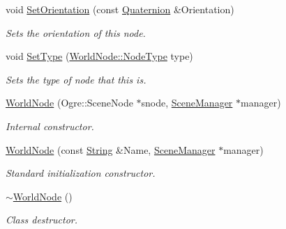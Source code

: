 \begin{DoxyCompactItemize}
void \hyperlink{classMezzanine_1_1WorldNode_afe9db5c3abeb608bf2d589c2a61da546}{SetOrientation} (const \hyperlink{classMezzanine_1_1Quaternion}{Quaternion} \&Orientation)
\begin{DoxyCompactList}\small\item\em Sets the orientation of this node. \item\end{DoxyCompactList}\item 
void \hyperlink{classMezzanine_1_1WorldNode_acccc6e4d11aad8bb7a495a64b5886b69}{SetType} (\hyperlink{classMezzanine_1_1WorldNode_a7b41cfe149e688905e56fb395d6a2493}{WorldNode::NodeType} type)
\begin{DoxyCompactList}\small\item\em Sets the type of node that this is. \item\end{DoxyCompactList}\item 
\hyperlink{classMezzanine_1_1WorldNode_ad9bb9f0f1d375fbd21d44c5520b0a58f}{WorldNode} (Ogre::SceneNode $\ast$snode, \hyperlink{classMezzanine_1_1SceneManager}{SceneManager} $\ast$manager)
\begin{DoxyCompactList}\small\item\em Internal constructor. \item\end{DoxyCompactList}\item 
\hyperlink{classMezzanine_1_1WorldNode_a28cfcc431cacc61e0361010f6eff07ab}{WorldNode} (const \hyperlink{namespaceMezzanine_acf9fcc130e6ebf08e3d8491aebcf1c86}{String} \&Name, \hyperlink{classMezzanine_1_1SceneManager}{SceneManager} $\ast$manager)
\begin{DoxyCompactList}\small\item\em Standard initialization constructor. \item\end{DoxyCompactList}\item 
\hypertarget{classMezzanine_1_1WorldNode_a7584e9792b3ceb2bd5effc1ddb50c266}{
\hyperlink{classMezzanine_1_1WorldNode_a7584e9792b3ceb2bd5effc1ddb50c266}{$\sim$WorldNode} ()}
\label{classMezzanine_1_1WorldNode_a7584e9792b3ceb2bd5effc1ddb50c266}

\begin{DoxyCompactList}\small\item\em Class destructor. \item\end{DoxyCompactList}\end{DoxyCompactItemize}
